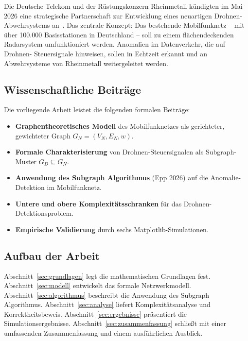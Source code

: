 ﻿\documentclass[a4paper,12pt]{article}
\theoremstyle{definition}
\begin{document}
Die Deutsche Telekom und der R\"ustungskonzern Rheinmetall k\"undigten im Mai 2026
eine strategische Partnerschaft zur Entwicklung eines neuartigen Drohnen-Abwehrsystems
an~\cite{telekom2026}. Das zentrale Konzept: Das bestehende Mobilfunknetz -- mit
\"uber 100.000 Basisstationen in Deutschland -- soll zu einem fl\"achendeckenden
Radarsystem umfunktioniert werden. Anomalien im Datenverkehr, die auf Drohnen-
Steuersignale hinweisen, sollen in Echtzeit erkannt und an Abwehrsysteme von
Rheinmetall weitergeleitet werden.

\subsection{Wissenschaftliche Beitr\"age}

Die vorliegende Arbeit leistet die folgenden formalen Beitr\"age:

\begin{itemize}
    \item \textbf{Graphentheoretisches Modell} des Mobilfunknetzes als
          gerichteter, gewichteter Graph $G_N = (V_N, E_N, w)$.
    \item \textbf{Formale Charakterisierung} von Drohnen-Steuersignalen
          als Subgraph-Muster $G_D \subseteq G_N$.
    \item \textbf{Anwendung des Subgraph Algorithmus} (Epp 2026) auf die
          Anomalie-Detektion im Mobilfunknetz.
    \item \textbf{Untere und obere Komplexit\"atsschranken} f\"ur das
          Drohnen-Detektionsproblem.
    \item \textbf{Empirische Validierung} durch sechs Matplotlib-Simulationen.
\end{itemize}

\subsection{Aufbau der Arbeit}

Abschnitt~\ref{sec:grundlagen} legt die mathematischen Grundlagen fest.
Abschnitt~\ref{sec:modell} entwickelt das formale Netzwerkmodell.
Abschnitt~\ref{sec:algorithmus} beschreibt die Anwendung des Subgraph Algorithmus.
Abschnitt~\ref{sec:analyse} liefert Komplexit\"atsanalyse und Korrektheitsbeweis.
Abschnitt~\ref{sec:ergebnisse} pr\"asentiert die Simulationsergebnisse.
Abschnitt~\ref{sec:zusammenfassung} schlie\ss{}t mit einer umfassenden Zusammenfassung
und einem ausf\"uhrlichen Ausblick.
\end{document}
